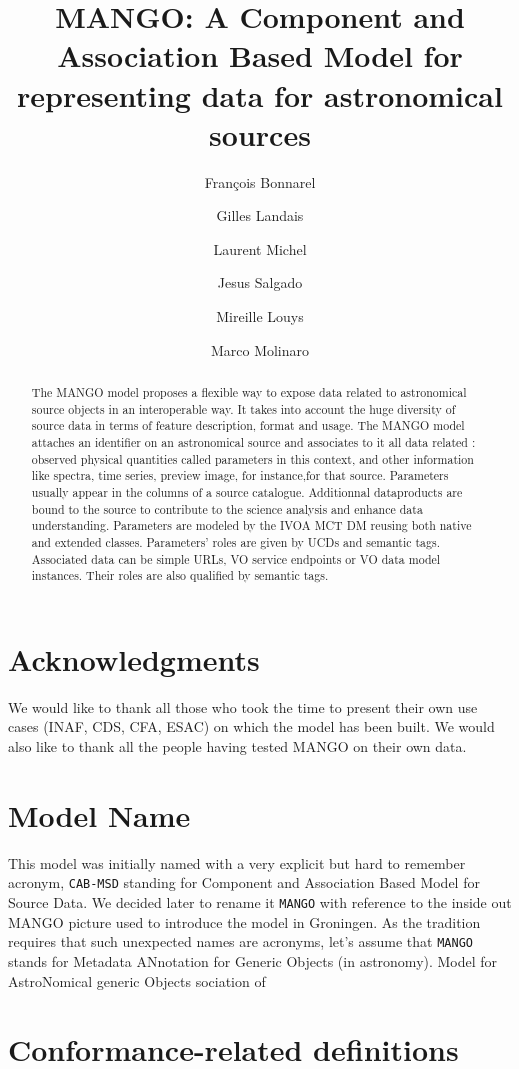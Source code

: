 \documentclass[11pt,a4paper]{ivoa}
\title{MANGO: A Component and Association Based Model for representing data for astronomical sources}
\author{François Bonnarel}
\author{Gilles Landais}
\author{Laurent Michel}
\author{Jesus Salgado}
\author{Mireille Louys}
\author{Marco Molinaro}
\begin{document}
\begin{abstract}
The MANGO model proposes a flexible way to expose data related to astronomical source objects in an interoperable way.
It takes into account the huge diversity of source data in terms of feature description, format and usage.
The MANGO model attaches an identifier on an astronomical source and associates to it all data related : observed physical quantities called parameters in this context, and other information like spectra, time series, preview image, for instance,for that source.
Parameters usually appear in the columns of a source catalogue. Additionnal dataproducts are bound to the source to contribute to the science analysis and enhance data understanding.
Parameters are modeled by the IVOA MCT DM reusing both native and extended classes. Parameters' roles are given by UCDs and semantic tags.
Associated data can be simple URLs, VO service endpoints or VO data model instances. Their roles are also qualified by semantic tags.

\end{abstract}


\section*{Acknowledgments}

We would like to thank all those who took the time to present their own use cases (INAF, CDS, CFA, ESAC) on which the model has been built.
We would also like to thank all the people having tested MANGO on their own data.

\section*{Model Name}
This model was initially named with a very explicit but hard to remember acronym, \texttt{CAB-MSD} standing for Component and Association Based Model for Source Data. We decided later to rename it \texttt{MANGO} with reference to the inside out MANGO picture used to introduce the model in Groningen. As the tradition requires that such unexpected names are acronyms, let's assume that \texttt{MANGO} stands for
Metadata ANnotation for Generic Objects (in astronomy).
Model for AstroNomical generic Objects sociation of


\section*{Conformance-related definitions}
\end{document}
